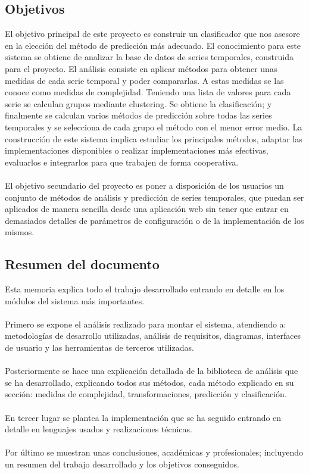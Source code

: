 \documentclass[14pt]{extarticle}
\theoremstyle{definition}
\theoremstyle{remark}
\begin{document}
\subsection{Objetivos}\label{sec:objetivos}
El objetivo principal de este proyecto es construir un clasificador que nos asesore en la elección del método de predicción más adecuado. El conocimiento para este sistema se obtiene de analizar la base de datos de series temporales, construida para el proyecto. El análisis consiste en aplicar métodos para obtener unas medidas de cada serie temporal y poder compararlas. A estas medidas se las conoce como medidas de complejidad. Teniendo una lista de valores para cada serie se calculan grupos mediante clustering. Se obtiene la clasificación; y finalmente se calculan varios métodos de predicción sobre todas las series temporales y se selecciona de cada grupo el método con el menor error medio. La construcción de este sistema implica estudiar los principales métodos, adaptar las implementaciones disponibles o realizar implementaciones más efectivas, evaluarlos e integrarlos para que trabajen de forma cooperativa.\\\\
El objetivo secundario del proyecto es poner a disposición de los usuarios un conjunto de métodos de análisis y predicción de series temporales, que puedan ser aplicados de manera sencilla desde una aplicación web sin tener que entrar en demasiados detalles de parámetros de configuración o de la implementación de los mismos.
\subsection{Resumen del documento}\label{sec:resumen}
Esta memoria explica todo el trabajo desarrollado entrando en detalle en los módulos del sistema más importantes.\\\\ Primero se expone el análisis realizado para montar el sistema, atendiendo a: metodologías de desarrollo utilizadas, análisis de requisitos, diagramas, interfaces de usuario y las herramientas de terceros utilizadas.\\\\Posteriormente se hace una explicación detallada de la biblioteca de análisis que se ha desarrollado, explicando todos sus métodos, cada método explicado en su sección: medidas de complejidad, transformaciones, predicción y clasificación.\\\\En tercer lugar se plantea la implementación que se ha seguido entrando en detalle en lenguajes usados y realizaciones técnicas.\\\\Por último se muestran unas conclusiones, académicas y profesionales; incluyendo un resumen del trabajo desarrollado y los objetivos conseguidos.
\newpage
\end{document}
